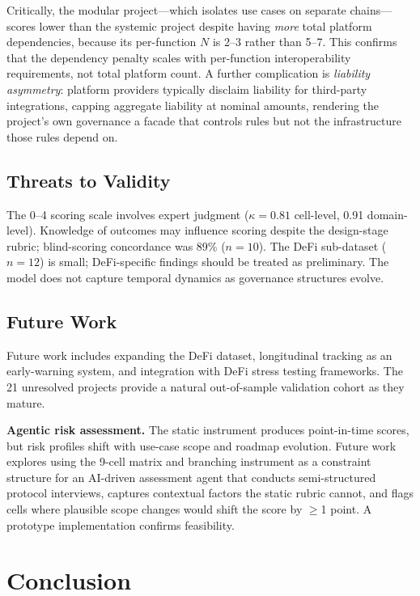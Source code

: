 \documentclass[conference]{IEEEtran}
\begin{document}
Critically, the modular project---which isolates use cases on separate chains---scores lower than the systemic project despite having \textit{more} total platform dependencies, because its per-function $N$ is 2--3 rather than 5--7. This confirms that the dependency penalty scales with per-function interoperability requirements, not total platform count. A further complication is \textit{liability asymmetry}: platform providers typically disclaim liability for third-party integrations, capping aggregate liability at nominal amounts, rendering the project's own governance a facade that controls rules but not the infrastructure those rules depend on.

\subsection{Threats to Validity}

The 0--4 scoring scale involves expert judgment ($\kappa = 0.81$ cell-level, 0.91 domain-level). Knowledge of outcomes may influence scoring despite the design-stage rubric; blind-scoring concordance was 89\% ($n=10$). The DeFi sub-dataset ($n=12$) is small; DeFi-specific findings should be treated as preliminary. The model does not capture temporal dynamics as governance structures evolve.

\subsection{Future Work}

Future work includes expanding the DeFi dataset, longitudinal tracking as an early-warning system, and integration with DeFi stress testing frameworks. The 21 unresolved projects provide a natural out-of-sample validation cohort as they mature.

\textbf{Agentic risk assessment.} The static instrument produces point-in-time scores, but risk profiles shift with use-case scope and roadmap evolution. Future work explores using the 9-cell matrix and branching instrument as a constraint structure for an AI-driven assessment agent that conducts semi-structured protocol interviews, captures contextual factors the static rubric cannot, and flags cells where plausible scope changes would shift the score by $\geq$1 point. A prototype implementation confirms feasibility.

\section{Conclusion}
\end{document}
